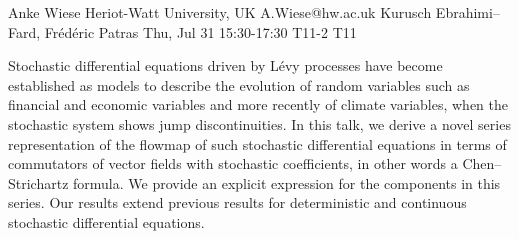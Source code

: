 \begin{talk}
  {Anke Wiese}%
  {Heriot-Watt University, UK}%
  {A.Wiese@hw.ac.uk}%
  {Kurusch Ebrahimi--Fard, Fr{\'e}d{\'e}ric Patras}%
  {}%
  {}%
  {Thu, Jul 31 15:30-17:30}%
  {T11-2}%
  {T11}%
  
				

Stochastic differential equations driven by L{\'e}vy processes have become established as models to describe the evolution of random variables such as financial and economic variables and more recently of climate variables, when the stochastic system shows jump discontinuities. In this talk, we derive a novel series representation of the flowmap of such stochastic 
differential equations 
in terms of commutators of vector fields with stochastic 
coefficients, in other words a Chen--Strichartz formula. We provide an explicit expression for the components in this series. 
Our results extend previous results
for deterministic and continuous stochastic differential equations.		
\end{talk}

